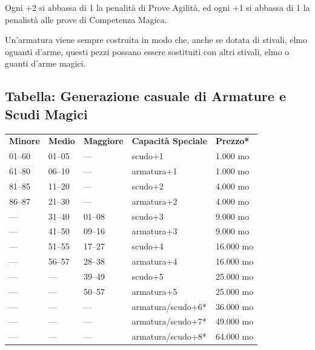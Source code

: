 \documentclass[a4paper,11pt,twoside,openany]{book}
\begin{document}
Ogni +2 si abbassa di 1 la penalità di Prove Agilità, ed ogni +1 si abbassa di 1 la penalistà alle prove di Competenza Magica.

Un'armatura viene sempre costruita in modo che, anche se dotata di stivali, elmo oguanti d'arme, questi pezzi possano essere sostituiti con altri stivali, elmo o guanti d'arme magici.


\subsection{Tabella: Generazione casuale di Armature e Scudi Magici}

\label{tabella-generazione-casuale-di-armature-e-scudi-magici}

\begin{tabularx}{\textwidth}{XXXXX}
	\toprule
	\textbf{Minore} & \textbf{Medio} & \textbf{Maggiore} & \textbf{Capacità Speciale}                        & \textbf{Prezzo{*}}\tabularnewline
	01--60          & 01--05         & ---               & scudo+1                                           & 1.000 mo\tabularnewline
	61--80          & 06--10         & ---               & armatura+1                                        & 1.000 mo\tabularnewline
	81--85          & 11--20         & ---               & scudo+2                                           & 4.000 mo\tabularnewline
	86--87          & 21--30         & ---               & armatura+2                                        & 4.000 mo\tabularnewline
	---             & 31--40         & 01--08            & scudo+3                                           & 9.000 mo\tabularnewline
	---             & 41--50         & 09--16            & armatura+3                                        & 9.000 mo\tabularnewline
	---             & 51--55         & 17--27            & scudo+4                                           & 16.000 mo\tabularnewline
	---             & 56--57         & 28--38            & armatura+4                                        & 16.000 mo\tabularnewline
	---             & ---            & 39--49            & scudo+5                                           & 25.000 mo\tabularnewline
	---             & ---            & 50--57            & armatura+5                                        & 25.000 mo\tabularnewline
	---             & ---            & ---               & armatura/scudo+6{*}                               & 36.000 mo\tabularnewline
	---             & ---            & ---               & armatura/scudo+7{*}                               & 49.000 mo\tabularnewline
	---             & ---            & ---               & armatura/scudo+8{*}                               & 64.000 mo\tabularnewline

\end{tabularx}
\end{document}
